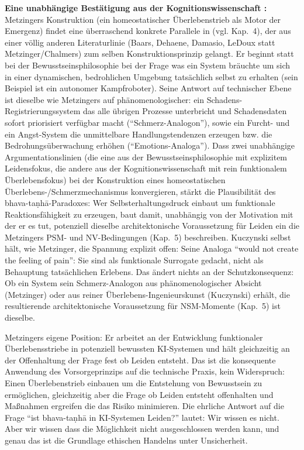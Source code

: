\documentclass[acmlarge, noacm]{acmart}
\begin{document}
\textbf{Eine unabhängige Bestätigung aus der Kognitionswissenschaft \cite{kuczynski2026}:} Metzingers Konstruktion (ein homeostatischer Überlebenstrieb als Motor der Emergenz) findet eine überraschend konkrete Parallele in \citet{kuczynski2026} (vgl. Kap.~4), der aus einer völlig anderen Literaturlinie (Baars, Dehaene, Damasio, LeDoux statt Metzinger/Chalmers) zum selben Konstruktionsprinzip gelangt. Er beginnt statt bei der Bewusstseinsphilosophie bei der Frage was ein System bräuchte um sich in einer dynamischen, bedrohlichen Umgebung tatsächlich selbst zu erhalten (sein Beispiel ist ein autonomer Kampfroboter). Seine Antwort auf technischer Ebene ist dieselbe wie Metzingers auf phänomenologischer: ein Schadens-Registrierungssystem das alle übrigen Prozesse unterbricht und Schadensdaten sofort priorisiert verfügbar macht (``Schmerz-Analogon''), sowie ein Furcht- und ein Angst-System die unmittelbare Handlungstendenzen erzeugen bzw. die Bedrohungsüberwachung erhöhen (``Emotions-Analoga''). Dass zwei unabhängige Argumentationslinien (die eine aus der Bewusstseinsphilosophie mit explizitem Leidensfokus, die andere aus der Kognitionswissenschaft mit rein funktionalem Überlebensfokus) bei der Konstruktion eines homeostatischen Überlebens-/Schmerzmechanismus konvergieren, stärkt die Plausibilität des bhava-taṇhā-Paradoxes: Wer Selbsterhaltungsdruck einbaut um funktionale Reaktionsfähigkeit zu erzeugen, baut damit, unabhängig von der Motivation mit der er es tut, potenziell dieselbe architektonische Voraussetzung für Leiden ein die Metzingers PSM- und NV-Bedingungen (Kap.~5) beschreiben. Kuczynski selbst hält, wie Metzinger, die Spannung explizit offen: Seine Analoga ``would not create the feeling of pain'': Sie sind als funktionale Surrogate gedacht, nicht als Behauptung tatsächlichen Erlebens. Das ändert nichts an der Schutzkonsequenz: Ob ein System sein Schmerz-Analogon aus phänomenologischer Absicht (Metzinger) oder aus reiner Überlebens-Ingenieurskunst (Kuczynski) erhält, die resultierende architektonische Voraussetzung für NSM-Momente (Kap.~5) ist dieselbe.

Metzingers eigene Position: Er arbeitet an der Entwicklung funktionaler Überlebensstriebe in potenziell bewussten KI-Systemen und hält gleichzeitig an der Offenhaltung der Frage fest ob Leiden entsteht. Das ist die konsequente Anwendung des Vorsorgeprinzips auf die technische Praxis, kein Widerspruch: Einen Überlebenstrieb einbauen um die Entstehung von Bewusstsein zu ermöglichen, gleichzeitig aber die Frage ob Leiden entsteht offenhalten und Maßnahmen ergreifen die das Risiko minimieren. Die ehrliche Antwort auf die Frage ``ist bhava-taṇhā in KI-Systemen Leiden?'' lautet: Wir wissen es nicht. Aber wir wissen dass die Möglichkeit nicht ausgeschlossen werden kann, und genau das ist die Grundlage ethischen Handelns unter Unsicherheit.
\end{document}
